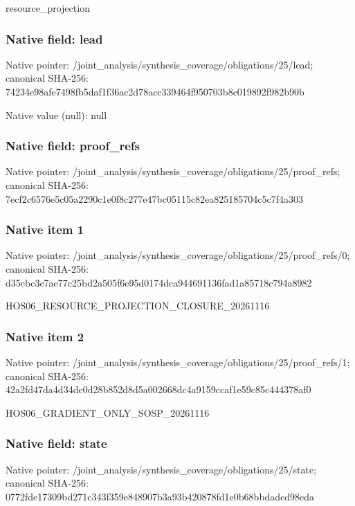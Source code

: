 \documentclass[10pt,a4paper]{article}
\begin{document}
\begingroup\raggedright\sloppy resource\_\allowbreak{}projection\par\endgroup

\subsubsection{Native field: lead}
Native pointer: /joint\_\allowbreak{}analysis/synthesis\_\allowbreak{}coverage/obligations/25/lead; canonical SHA-256: 74234e98afe7498fb5daf1f36ac2d78acc339464f950703b8c019892f982b90b

Native value (null): null

\subsubsection{Native field: proof\_\allowbreak{}refs}
Native pointer: /joint\_\allowbreak{}analysis/synthesis\_\allowbreak{}coverage/obligations/25/proof\_\allowbreak{}refs; canonical SHA-256: 7ecf2c6576e5c05a2290c1e0f8c277e47bc05115c82ea825185704c5c7f4a303

\subsubsection{Native item 1}
Native pointer: /joint\_\allowbreak{}analysis/synthesis\_\allowbreak{}coverage/obligations/25/proof\_\allowbreak{}refs/0; canonical SHA-256: d35cbc3c7ae77c25bd2a505f6e95d0174dca944691136fad1a85718c794a8982

\begingroup\raggedright\sloppy HOS06\_\allowbreak{}RESOURCE\_\allowbreak{}PROJECTION\_\allowbreak{}CLOSURE\_\allowbreak{}20261116\par\endgroup

\subsubsection{Native item 2}
Native pointer: /joint\_\allowbreak{}analysis/synthesis\_\allowbreak{}coverage/obligations/25/proof\_\allowbreak{}refs/1; canonical SHA-256: 42a2fd47da4d34dc0d28b852d8d5a002668dc4a9159ccaf1e59c85c444378af0

\begingroup\raggedright\sloppy HOS06\_\allowbreak{}GRADIENT\_\allowbreak{}ONLY\_\allowbreak{}SOSP\_\allowbreak{}20261116\par\endgroup

\subsubsection{Native field: state}
Native pointer: /joint\_\allowbreak{}analysis/synthesis\_\allowbreak{}coverage/obligations/25/state; canonical SHA-256: 0772fde17309bd271c343f359e848907b3a93b420878fd1e0b68bbdadcd98eda
\end{document}
